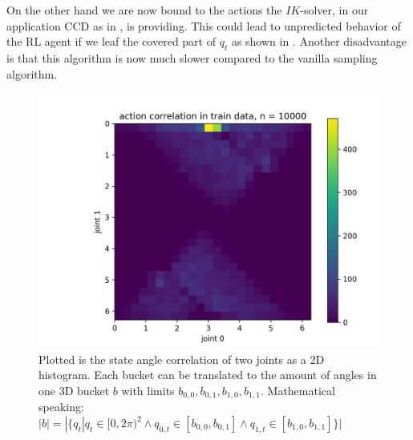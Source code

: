 On the other hand we are now  bound to the actions the $IK$-solver, in our application CCD as in , is providing. This could lead to unpredicted behavior of the RL agent if we leaf the covered part of $q_t$ as shown in . Another disadvantage is that this algorithm is now much slower compared to the vanilla sampling algorithm. 
\begin{figure}
    \begin{center}
        \includegraphics[width=0.46 \linewidth]{figures/methodology/dataset/action_correlation.png}
    \end{center}
    \caption[action correlation CCD]{Plotted is the state angle correlation of two joints as a 2D histogram. Each bucket can be translated to the amount of angles in one 3D bucket $b$ with limits $b_{0, 0}, b_{0, 1}, b_{1, 0}, b_{1, 1}$. Mathematical speaking: $|b| = |\{q_t | q_t \in [0, 2\pi)^2 \land q_{0, t} \in [b_{0, 0}, b_{0, 1}] \land q_{1, t} \in [b_{1, 0}, b_{1, 1}]\}|$}
    \label{fig:dataset_action_correlation}
\end{figure}

